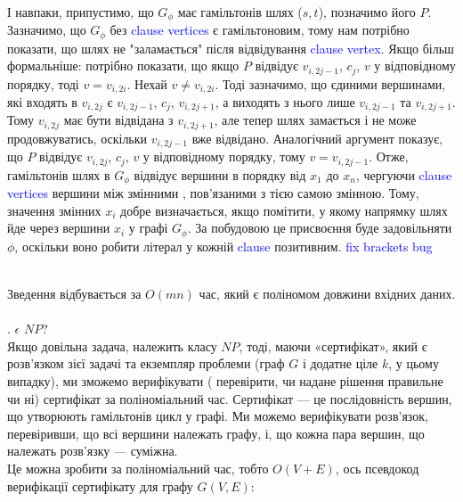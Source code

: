\documentclass[14pt]{article}
\begin{document}
\begin{spacing}{1.175}
    \\
    \quad І навпаки, припустимо, що \(G_{\phi}\) має гамільтонів шлях (\(s, t\)), позначимо його \(P\). Зазначимо, що \(G_{\phi}\) без \textcolor{blue}{clause vertices}  є гамільтоновим, тому нам потрібно показати, що шлях не "заламається" після відвідування \textcolor{blue}{clause vertex}. Якщо більш формальніше: потрібно показати, що якщо \(P\) відвідує \(v_{i, 2j-1}\), \(c_j\), \(v\) у відповідному порядку, тоді \(v = v_{i,2i}\). Нехай \(v \neq v_{i,2i}\). Тоді зазначимо, що єдиними вершинами, які входять в \(v_{i,2j}\) є \(v_{i,2j-1}\), \(c_j\), \(v_{i,2j+1}\), а виходять з нього лише \(v_{i,2j-1}\) та \(v_{i,2j+1}\). Тому \(v_{i,2j}\) має бути відвідана з \(v_{i,2j+1}\), але тепер шлях замається і не може продовжуватись, оскільки \(v_{i,2j-1}\) вже відвідано. Аналогічний аргумент показує, що \(P\) відвідує \(v_{i, 2j}\), \(c_j\), \(v\) у відповідному порядку, тому \(v = v_{i,2j-1}\). Отже, гамільтонів шлях в \(G_{\phi}\) відвідує вершини в порядку від \(x_1\) до \(x_n\), чергуючи \textcolor{blue}{clause vertices} вершини між змінними , пов'язаними з тією самою змінною. Тому, значення змінних \(x_i\) добре визначається, якщо помітити, у якому напрямку шлях йде через вершини \(x_i\) у графі \(G_{\phi}\). За побудовою це присвоєння буде задовільняти \(\phi\), оскільки воно робити літерал у кожній \textcolor{blue}{clause} позитивним. \textcolor{blue}{fix brackets bug}
    
    \\
    \quad Зведення відбувається за \(O(mn)\) час, який є поліномом довжини вхідних даних.
    \\


    \\
    . \hamcycle \(\epsilon\) \(NP\)?\\
        Якщо довільна задача, належить класу \(NP\), тоді, маючи «сертифікат», який є розв'язком зієї задачі та екземпляр проблеми (граф \(G\) і додатне ціле \(k\), у цьому випадку), ми зможемо верифікувати ( перевірити, чи надане рішення правильне чи ні) сертифікат за поліноміальний час. Сертифікат — це послідовність вершин, що утворюють гамільтонів цикл у графі. Ми можемо верифікувати розв'язок, перевіривши, що всі вершини належать графу, і, що кожна пара вершин, що належать розв’язку — суміжна.\\ Це можна зробити за поліноміальний час, тобто \(O(V + E)\), ось
        псевдокод верифікації сертифікату для графу \(G(V, E)\):
        \\
            

\end{spacing}
\end{document}
